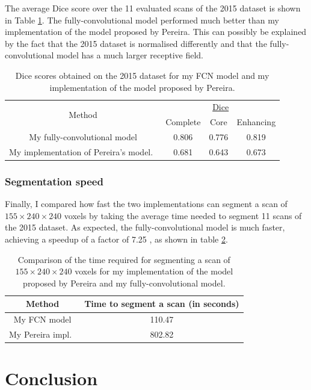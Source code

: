 \documentclass[12pt,a4paper,twoside,openright]{report}
\begin{document}
The average Dice score over the 11 evaluated scans of the 2015 dataset is shown in Table \ref{table:2015_dice}. The fully-convolutional model performed much better than my implementation of the model proposed by Pereira. This can possibly be explained by the fact that the 2015 dataset is normalised differently and that the fully-convolutional model has a much larger receptive field.
\begin{table}
\centering	
\begin{tabular}{c | c c c }
\multirow{2}{*}{Method} & \multicolumn{3}{c}{\underline{Dice}} \\
 & Complete & Core & Enhancing \\
 \hline
 My fully-convolutional model & 0.806 & 0.776 & 0.819\\
 My implementation of Pereira's model.\ & 0.681 & 0.643 & 0.673\\
\end{tabular}
\caption{Dice scores obtained on the 2015 dataset for my FCN model and my implementation of the model proposed by Pereira.}
\label{table:2015_dice}
\end{table}

\subsection{Segmentation speed}
Finally, I compared how fast the two implementations can segment a scan of $155 \times 240 \times 240$ voxels by taking the average time needed to segment 11 scans of the 2015 dataset. As expected, the fully-convolutional model is much faster, achieving a speedup of a factor of 7.25 , as shown in table \ref{table:time_comparison}.
\begin{table}[h]
\centering	
\begin{tabular}{c | c }
Method & Time to segment a scan (in seconds)\\
 \hline
 My FCN model & 110.47 \\
 My Pereira impl.\ & 802.82 \\
\end{tabular}
\caption[Comparison of the time required for segmenting a scan of $155 \times 240 \times 240$ voxels.]{Comparison of the time required for segmenting a scan of $155 \times 240 \times 240$ voxels for my implementation of the model proposed by Pereira and my fully-convolutional model.}
\label{table:time_comparison}
\end{table}

\chapter{Conclusion}
\end{document}
